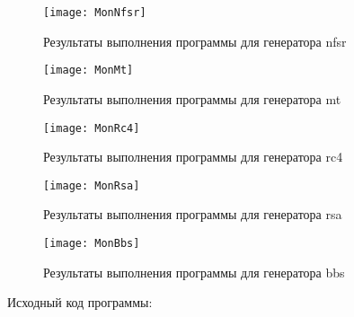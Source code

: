 \documentclass[bachelor, och, coursework]{shiza}
\begin{document}
	\begin{figure}[H]
		\centering
		\texttt{[image: MonNfsr]}
		\caption{Результаты выполнения программы для генератора nfsr}
		\label{fig:MonNfsr}
	\end{figure}
	
	\begin{figure}[H]
		\centering
		\texttt{[image: MonMt]}
		\caption{Результаты выполнения программы для генератора mt}
		\label{fig:MonMt}
	\end{figure}		
	
	\begin{figure}[H]
		\centering
		\texttt{[image: MonRc4]}
		\caption{Результаты выполнения программы для генератора rc4}
		\label{fig:MonRc4}
	\end{figure}
	
	\begin{figure}[H]
		\centering
		\texttt{[image: MonRsa]}
		\caption{Результаты выполнения программы для генератора rsa}
		\label{fig:MonRsa}
	\end{figure}
	
	\begin{figure}[H]
		\centering
		\texttt{[image: MonBbs]}
		\caption{Результаты выполнения программы для генератора bbs}
		\label{fig:MonBbs}
	\end{figure}
	
	Исходный код программы:
	
\end{document}
